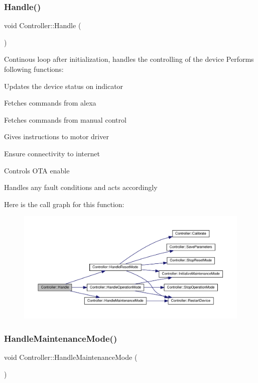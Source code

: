 \subsubsection{\texorpdfstring{Handle()}{Handle()}}
{\footnotesize\ttfamily void Controller\+::\+Handle (\begin{DoxyParamCaption}{ }\end{DoxyParamCaption})}



Continous loop after initialization, handles the controlling of the device Performs following functions\+: 


\begin{DoxyEnumerate}
\item Updates the device status on indicator
\item Fetches commands from alexa
\item Fetches commands from manual control
\item Gives instructions to motor driver
\item Ensure connectivity to internet
\item Controls O\+TA enable
\item Handles any fault conditions and acts accordingly 
\end{DoxyEnumerate}Here is the call graph for this function\+:
\nopagebreak
\begin{figure}[H]
\begin{center}
\leavevmode
\includegraphics[width=350pt]{classController_a4705ffb61d722e4916ba0d279dc27395_cgraph}
\end{center}
\end{figure}
\mbox{\label{classController_a78080d5bfa37c5e783a630255846b721}} 
\subsubsection{\texorpdfstring{Handle\+Maintenance\+Mode()}{HandleMaintenanceMode()}}
{\footnotesize\ttfamily void Controller\+::\+Handle\+Maintenance\+Mode (\begin{DoxyParamCaption}{ }\end{DoxyParamCaption})\hspace{0.3cm}{\ttfamily [private]}}



